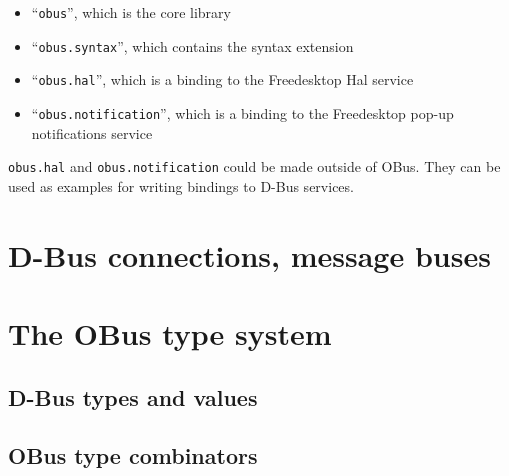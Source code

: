 \documentclass{article}
\begin{document}
\begin{itemize}
\item ``\texttt{obus}'', which is the core library
\item ``\texttt{obus.syntax}'', which contains the syntax extension
\item ``\texttt{obus.hal}'', which is a binding to the Freedesktop
  Hal service
\item ``\texttt{obus.notification}'', which is a binding to the
  Freedesktop pop-up notifications service
\end{itemize}

\texttt{obus.hal} and \texttt{obus.notification} could be made outside
of OBus. They can be used as examples for writing bindings to D-Bus
services.

\section{D-Bus connections, message buses}



\section{The OBus type system}

\subsection{D-Bus types and values}


\subsection{OBus type combinators}

\end{document}
